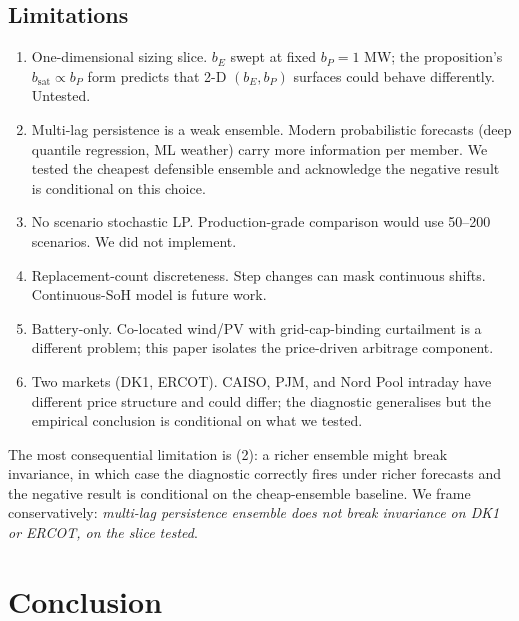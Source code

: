 \documentclass[11pt]{article}
\begin{document}
\subsection{Limitations}

\begin{enumerate}
\item One-dimensional sizing slice. $b_E$ swept at fixed $b_P = 1$ MW; the proposition's $b_{\mathrm{sat}} \propto b_P$ form predicts that 2-D $(b_E, b_P)$ surfaces could behave differently. Untested.
\item Multi-lag persistence is a weak ensemble. Modern probabilistic forecasts (deep quantile regression, ML weather) carry more information per member. We tested the cheapest defensible ensemble and acknowledge the negative result is conditional on this choice.
\item No scenario stochastic LP. Production-grade comparison \citep{birge1997stochastic, krishnamurthy2018stochastic} would use 50--200 scenarios. We did not implement.
\item Replacement-count discreteness. Step changes can mask continuous shifts. Continuous-SoH model is future work.
\item Battery-only. Co-located wind/PV with grid-cap-binding curtailment is a different problem; this paper isolates the price-driven arbitrage component.
\item Two markets (DK1, ERCOT). CAISO, PJM, and Nord Pool intraday have different price structure and could differ; the diagnostic generalises but the empirical conclusion is conditional on what we tested.
\end{enumerate}

The most consequential limitation is (2): a richer ensemble might break invariance, in which case the diagnostic correctly fires under richer forecasts and the negative result is conditional on the cheap-ensemble baseline. We frame conservatively: \emph{multi-lag persistence ensemble does not break invariance on DK1 or ERCOT, on the slice tested}.

\section{Conclusion}
\end{document}
